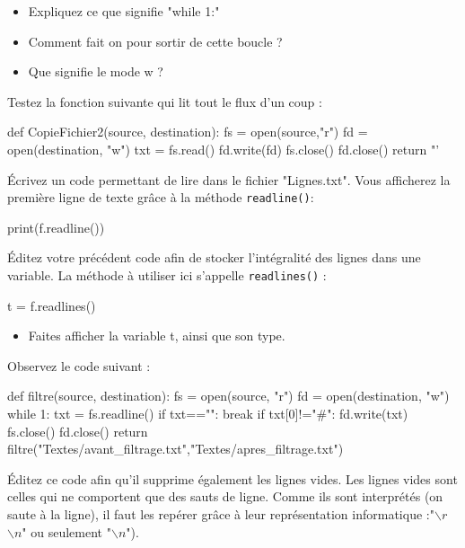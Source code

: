 
\begin{itemize}
\item Expliquez ce que signifie "while 1:"
\item Comment fait on pour sortir de cette boucle ?
\item Que signifie le mode w ?
\end{itemize}

Testez la fonction suivante qui lit tout le flux d'un coup :
\begin{python}
def CopieFichier2(source, destination):
  fs = open(source,"r")
  fd = open(destination, "w")
  txt = fs.read()
  fd.write(fd)
  fs.close()
  fd.close()
  return "'%
\end{python}
\exer
 Écrivez un code permettant de lire dans le fichier "Lignes.txt". Vous afficherez la première ligne de texte grâce à la méthode \texttt{readline()}:

\begin{python}
print(f.readline())
\end{python}

Éditez votre précédent code afin de stocker l'intégralité des lignes dans une
variable. La méthode à utiliser ici s'appelle  \texttt{readlines()} :

\begin{python}
t = f.readlines()
\end{python}

\begin{itemize}
 \item Faites afficher la variable t, ainsi que son type.
\end{itemize}

\exer

 Observez le code suivant :

\begin{python}
def filtre(source, destination):
  fs = open(source, "r")
  fd = open(destination, "w")
  while 1:
    txt = fs.readline()
    if txt=="":
      break
    if txt[0]!="#":
      fd.write(txt)
  fs.close()
  fd.close()
  return
filtre("Textes/avant_filtrage.txt","Textes/apres_filtrage.txt")
\end{python}

 Éditez ce code afin qu'il supprime également les lignes vides. Les lignes vides sont celles qui ne comportent que des sauts de ligne. Comme ils sont interprétés (on saute à la ligne), il faut les repérer grâce à leur représentation informatique :"$\backslash r$$\backslash n$" ou seulement "$\backslash n$"). %

